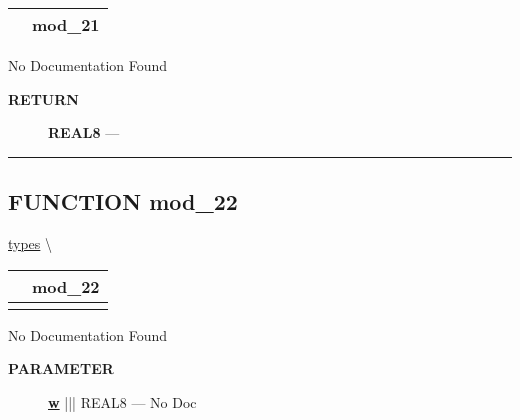 {\renewcommand{\arraystretch}{1.5}
\begin{tabularx}{\textwidth}{|>{\raggedright\arraybackslash}l|X|}
\hline
\hspace{0pt}\mytexttt{\color{red} } & \textbf{mod\_21} \\
\hline
\end{tabularx}
}

\par





No Documentation Found








\par
\begin{description}
\item [\colorbox{tagtype}{\color{white} \textbf{\textsf{RETURN}}}] \textbf{REAL8} --- 
\end{description}




\rule{\linewidth}{0.5pt}
\subsection*{\textsf{\colorbox{headtoc}{\color{white} FUNCTION}
mod\_22}}

\hypertarget{ecldoc:types.mod_22}{}
\hspace{0pt} \hyperlink{ecldoc:types}{types} \textbackslash 

{\renewcommand{\arraystretch}{1.5}
\begin{tabularx}{\textwidth}{|>{\raggedright\arraybackslash}l|X|}
\hline
\hspace{0pt}\mytexttt{\color{red} } & \textbf{mod\_22} \\
\hline
\multicolumn{2}{|>{\raggedright\arraybackslash}X|}{\hspace{0pt}\mytexttt{\color{param} (REAL8 w)}} \\
\hline
\end{tabularx}
}

\par





No Documentation Found






\par
\begin{description}
\item [\colorbox{tagtype}{\color{white} \textbf{\textsf{PARAMETER}}}] \textbf{\underline{w}} ||| REAL8 --- No Doc
\end{description}







